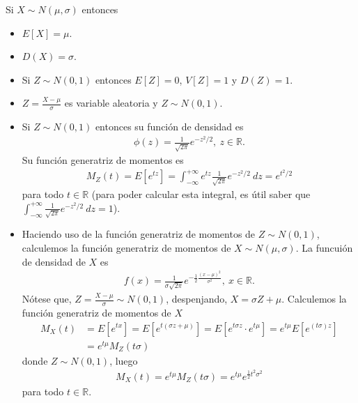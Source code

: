 \begin{obs}
    Si $X \sim N(\mu, \sigma)$ entonces
    \begin{itemize}
        \item $E[X] = \mu$.
        \item $D(X) = \sigma$.
        \item Si $Z \sim N(0,1)$ entonces $E[Z] = 0$, $V[Z] = 1$ y $D(Z) = 1$.
        \item $Z = \frac{X - \mu}{\sigma}$ es variable aleatoria y $Z \sim N(0,1)$.
        \item Si $Z \sim N(0,1)$ entonces su función de densidad es
              \begin{align*}
                  \phi(z) = \frac{1}{\sqrt{2\pi}}e^{-z^2/2}, \ z \in \mathbb{R}.
              \end{align*}
              Su función generatriz de momentos es
              \begin{align*}
                  M_Z(t) = E[e^{tz}] = \int_{-\infty}^{+\infty}{e^{tz}\frac{1}{\sqrt{2\pi}}e^{-z^2/2} \ dz} = e^{t^2/2}
              \end{align*}
              para todo $t \in \mathbb{R}$ (para poder calcular esta integral, es útil saber que $\int_{-\infty}^{+\infty}{\frac{1}{\sqrt{2\pi}}e^{-z^2/2} \ dz} = 1$).
        \item Haciendo uso de la función generatriz de momentos de $Z \sim N(0,1)$, calculemos la función generatriz de momentos de $X \sim N(\mu, \sigma)$. La funcuión de densidad de $X$ es
              \begin{align*}
                  f(x) = \frac{1}{\sigma \sqrt{2\pi}}e^{-\frac{1}{2}\frac{(x - \mu)^2}{\sigma^2}}, \ x \in \mathbb{R}.
              \end{align*}
              Nótese que, $Z = \frac{X - \mu}{\sigma} \sim N(0,1)$, despenjando, $X = \sigma Z + \mu$. Calculemos la función generatriz de momentos de $X$
              \begin{align*}
                  M_X(t) & = E[e^{tx}] = E[e^{t(\sigma z + \mu)}] = E[e^{t\sigma z} \cdot e^{t \mu}] = e^{t \mu} E[e^{(t\sigma) z}] \\
                         & = e^{t \mu}M_Z(t \sigma)
              \end{align*}
              donde $Z \sim N(0,1)$, luego
              \begin{align*}
                  M_X(t) = e^{t \mu}M_Z(t \sigma) = e^{t \mu}e^{\frac{1}{2}t^2 \sigma ^2}
              \end{align*}
              para todo $t \in \mathbb{R}$.
    \end{itemize}
\end{obs}

